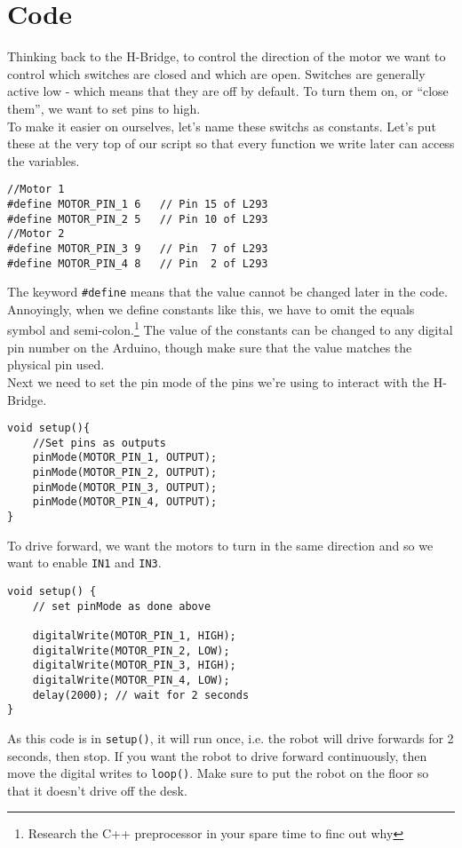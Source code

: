 \documentclass[../TinyBot.tex]{subfiles}
\begin{document}
\section{Code}





Thinking back to the H-Bridge, to control the direction of the motor we want to control which
switches are closed and which are open. Switches are generally active low - which means that 
they are off by default. To turn them on, or ``close them'', we want to set pins to high. \\

To make it easier on ourselves, let's name these switchs as constants. Let's put these
at the very top of our script so that every function we write later can access the variables. 

\begin{lstlisting}
//Motor 1
#define MOTOR_PIN_1 6   // Pin 15 of L293
#define MOTOR_PIN_2 5   // Pin 10 of L293
//Motor 2
#define MOTOR_PIN_3 9   // Pin  7 of L293
#define MOTOR_PIN_4 8   // Pin  2 of L293
\end{lstlisting}

The keyword \lstinline[]!#define! means that the value cannot be changed later in the code.
Annoyingly, when we define constants like this, we have to omit the equals symbol and
semi-colon.\footnote{Research the C++ preprocessor in your spare time to finc out why}
The value of the constants can be changed to any digital pin number on the Arduino,
though make sure that the value matches the physical pin used. \\


Next we need to set the pin mode of the pins we're using to interact with the H-Bridge.

\begin{lstlisting}
void setup(){
    //Set pins as outputs
    pinMode(MOTOR_PIN_1, OUTPUT);
    pinMode(MOTOR_PIN_2, OUTPUT);
    pinMode(MOTOR_PIN_3, OUTPUT);
    pinMode(MOTOR_PIN_4, OUTPUT);
}
\end{lstlisting}


To drive forward, we want the motors to turn in the same direction and so we want to enable \lstinline[]!IN1! and \lstinline[]!IN3!. 

\begin{lstlisting}
void setup() {
    // set pinMode as done above

    digitalWrite(MOTOR_PIN_1, HIGH);
    digitalWrite(MOTOR_PIN_2, LOW);
    digitalWrite(MOTOR_PIN_3, HIGH);
    digitalWrite(MOTOR_PIN_4, LOW);
    delay(2000); // wait for 2 seconds
}
\end{lstlisting}
As this code is in \lstinline[]!setup()!, it will run once, i.e. the robot will drive forwards for 2 seconds, then stop. If you want the robot to drive forward continuously, then move the digital writes to \lstinline[]!loop()!. Make sure to put the robot on the floor so that it doesn't drive off the desk.
\end{document}
